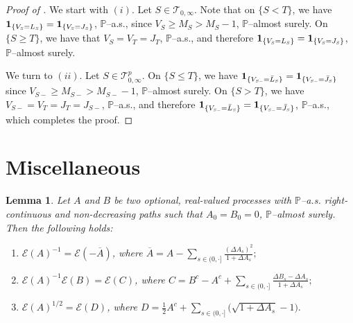 \documentclass[10pt]{article} %
\newtheorem{lemma}[theorem]{Lemma}
\newcommand\cE{\mathcal E}
\newcommand\cT{\mathcal T}
\newcommand{\smalltext}[1]{\text{\fontsize{4}{4}\selectfont$#1$}}
\def \P{\mathbb{P}}
\newcommand{\1}{\mathbf{1}}
\begin{document}
\begin{proof}[Proof of ]
	We start with $(i)$. Let $S \in \cT_{0,\infty}$. Note that on $\{S < T\}$, we have $\mathbf{1}_{\{V_\smalltext{S} = L_\smalltext{S}\}} = \mathbf{1}_{\{V_\smalltext{S} = J_\smalltext{S}\}}$, $\P$--a.s., since $V_S \geq M_S > M_S - 1$, $\P$--almost surely. On $\{S \geq T\}$, we have that $V_S = V_T = J_T$, $\P$--a.s., and therefore $\mathbf{1}_{\{V_\smalltext{S} = L_\smalltext{S}\}}= \mathbf{1}_{\{V_\smalltext{S} = J_\smalltext{S}\}}$, $\P$--almost surely. 
	
	\medskip
	We turn to $(ii)$. Let $S \in \cT^p_{0,\infty}$. On $\{S \leq T\}$, we have $\mathbf{1}_{\{V_{\smalltext{S}\smalltext{-}} = \bar L_\smalltext{S}\}} = \mathbf{1}_{\{V_{\smalltext{S}\smalltext{-}}=\bar J_\smalltext{S}\}}$ since $V_{S-} \geq M_{S-} > M_{S-} - 1$, $\P$--almost surely. On $\{S > T\}$, we have $V_{S-} = V_T = J_T = J_{S-}$, $\P$--a.s., and therefore $\mathbf{1}_{\{V_{\smalltext{S}\smalltext{-}} = \bar L_\smalltext{S}\}} = \mathbf{1}_{\{V_{\smalltext{S}\smalltext{-}}=\bar J_\smalltext{S}\}}$, $\P$--a.s., which completes the proof.
\end{proof}

\section{Miscellaneous}

\begin{lemma}\label{lem::stoch_exp_rules}
	Let $A$ and $B$ be two optional, real-valued processes with $\P$--{\rm a.s.} right-continuous and non-decreasing paths such that $A_0 = B_0 = 0$, $\P$--almost surely. Then the following holds:
	\begin{enumerate}
		\item[$(i)$] $\cE(A)^{-1} = \cE(-\overline A)$, where $\overline A = A - \sum_{s \in (0,\cdot]} \frac{(\Delta A_s)^2}{1+\Delta A_s};$
		\item[$(ii)$] $\cE(A)^{-1}\cE(B) = \cE(C)$, where $C = B^c - A^c + \sum_{s \in (0,\cdot]} \frac{\Delta B_s - \Delta A_s}{1+\Delta A_s};$
		\item[$(iii)$] $\cE(A)^{1/2} = \cE(D)$, where $D = \frac{1}{2} A^c + \sum_{s \in (0,\cdot]} \big(\sqrt{1+\Delta A_s}-1\big).$
	\end{enumerate}
\end{lemma}
\end{document}
